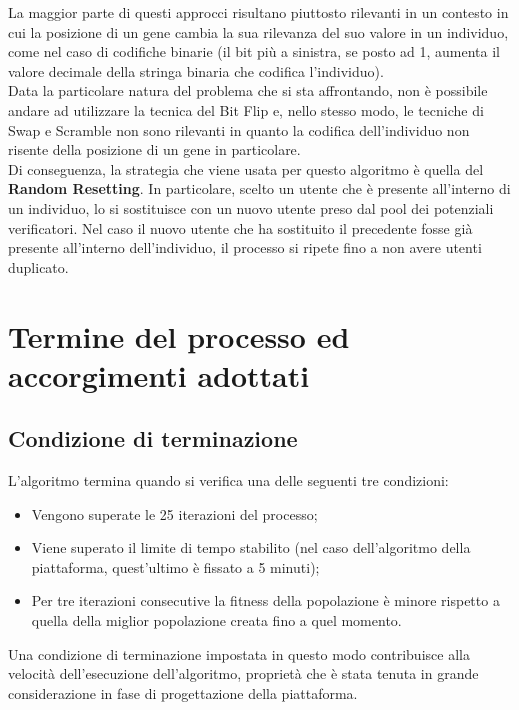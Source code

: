         La maggior parte di questi approcci risultano piuttosto rilevanti in un contesto in cui la posizione di un gene cambia la sua rilevanza del suo valore in un individuo, come nel caso di codifiche binarie (il bit più a sinistra, se posto ad 1, aumenta il valore decimale della stringa binaria che codifica l'individuo). \\
        Data la particolare natura del problema che si sta affrontando, non è possibile andare ad utilizzare la tecnica del Bit Flip e, nello stesso modo, le tecniche di Swap e Scramble non sono rilevanti in quanto la codifica dell'individuo non risente della posizione di un gene in particolare. \\
        Di conseguenza, la strategia che viene usata per questo algoritmo è quella del \textbf{Random Resetting}. In particolare, scelto un utente che è presente all'interno di un individuo, lo si sostituisce con un nuovo utente preso dal pool dei potenziali verificatori. Nel caso il nuovo utente che ha sostituito il precedente fosse già presente all'interno dell'individuo, il processo si ripete fino a non avere utenti duplicato.
        \newpage
\section{Termine del processo ed accorgimenti adottati}

    \subsection{Condizione di terminazione}
        L'algoritmo termina quando si verifica una delle seguenti tre condizioni:

        \begin{itemize}
            \item Vengono superate le 25 iterazioni del processo;
            \item Viene superato il limite di tempo stabilito (nel caso dell'algoritmo della piattaforma, quest'ultimo è fissato a 5 minuti);
            \item Per tre iterazioni consecutive la fitness della popolazione è minore rispetto a quella della miglior popolazione creata fino a quel momento.
        \end{itemize}

        Una condizione di terminazione impostata in questo modo contribuisce alla velocità dell'esecuzione dell'algoritmo, proprietà che è stata tenuta in grande considerazione in fase di progettazione della piattaforma.


